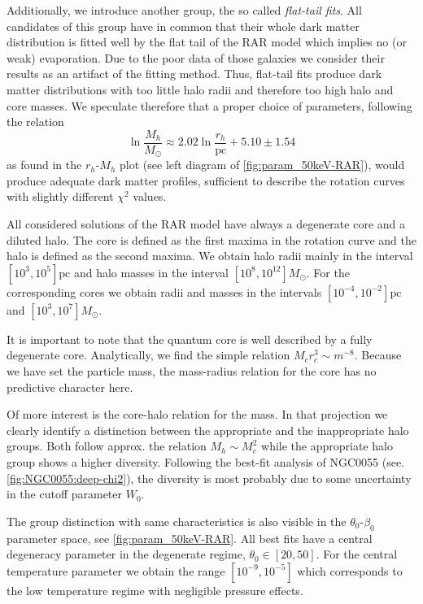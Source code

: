 Additionally, we introduce another group, the so called \textit{flat-tail fits}. All candidates of this group have in common that their whole dark matter distribution is fitted well by the flat tail of the RAR model which implies no (or weak) evaporation. Due to the poor data of those galaxies we consider their results as an artifact of the fitting method. Thus, flat-tail fits produce dark matter distributions with too little halo radii and therefore too high halo and core masses. We speculate therefore that a proper choice of parameters, following the relation \begin{equation}
	\label{eqn:rel:Mh-rh}
	\ln \frac{M_h}{M_\odot} \approx 2.02\ln \frac{r_h}{\mathrm{pc}} + 5.10 \pm 1.54
\end{equation} as found in the $r_h$-$M_h$ plot (see left diagram of \cref{fig:param_50keV-RAR}), would produce adequate dark matter profiles, sufficient to describe the rotation curves with slightly different $\chi^2$ values.


All considered solutions of the RAR model have always a degenerate core and a diluted halo. The core is defined as the first maxima in the rotation curve and the halo is defined as the second maxima. We obtain halo radii mainly in the interval $[10^3,10^5]\mathrm{pc}$ and halo masses in the interval $[10^8,10^{12}] M_\odot$. For the corresponding cores we obtain radii and masses in the intervals $[10^{-4},10^{-2}]\mathrm{pc}$ and $[10^3,10^{7}] M_\odot$.

It is important to note that the quantum core is well described by a fully degenerate core. Analytically, we find the simple relation $M_c r_c^3 \sim m^{-8}$. Because we have set the particle mass, the mass-radius relation for the core has no predictive character here.

Of more interest is the core-halo relation for the mass. In that projection we clearly identify a distinction between the appropriate and the inappropriate halo groups. Both follow approx. the relation $M_h \sim M_c^2$ while the appropriate halo group shows a higher diversity. Following the best-fit analysis of NGC0055 (see. \cref{fig:NGC0055:deep-chi2}), the diversity is most probably due to some uncertainty in the cutoff parameter $W_0$.

The group distinction with same characteristics is also visible in the $\theta_0$-$\beta_0$ parameter space, see \cref{fig:param_50keV-RAR}. All best fits have a central degeneracy parameter in the degenerate regime, $\theta_0 \in [20,50]$. For the central temperature parameter we obtain the range $[10^{-9},10^{-5}]$ which corresponds to the low temperature regime with negligible pressure effects.

